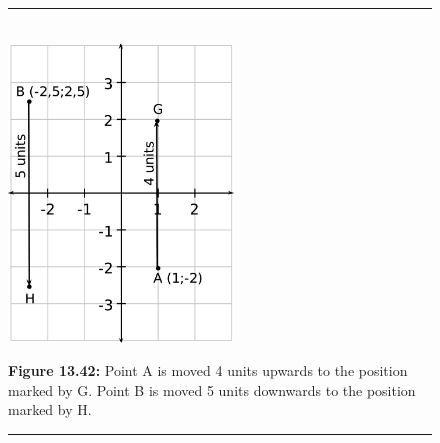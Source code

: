 	\begin{figure}[H] %
    \begin{center}
    \rule[.1in]{\figurerulewidth}{.005in} \\
        \label{m39358*uid70!!!underscore!!!media}\label{m39358*uid70!!!underscore!!!printimage}\includegraphics[height=300px]{col11306.imgs/m39358_MG10C14_023.png} %
        
      \vspace{2pt}
    \vspace{\rubberspace}\par \begin{cnxcaption}
	  \small \textbf{Figure 13.42: }Point A is moved 4 units upwards to the position marked by G. Point B is moved 5 units downwards to the position marked by H.
	\end{cnxcaption}
      
    \vspace{.1in}
    \rule[.1in]{\figurerulewidth}{.005in} \\
        
    \end{center}

 \end{figure}   

    \addtocounter{footnote}{-0}
    

